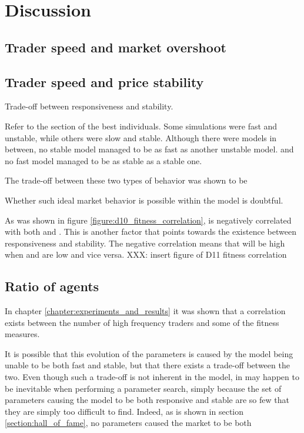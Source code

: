 \chapter{Discussion}\label{chapter:discussion}

\section{Trader speed and market overshoot}

\section{Trader speed and price stability}
Trade-off between responsiveness and stability.

Refer to the section of the best individuals. 
Some simulations were fast and unstable, while others were slow and stable. Although there were models in between, no stable model managed to be as fast as another unstable model. and no fast model managed to be as stable as a stable one. 

The trade-off between these two types of behavior was shown to be 

Whether such ideal market behavior is possible within the model is doubtful. 



As was shown in figure \ref{figure:d10_fitness_correlation}, \timetoreachnewfundamental{} is negatively correlated with both \stdev{} and \overshoot{}. This is another factor that points towards the existence between responsiveness and stability. The negative correlation means that \timetoreachnewfundamental will be high when \stdev and \overshoot are low and vice versa. 
XXX: insert figure of D11 fitness correlation

\section{Ratio of agents}
In chapter \ref{chapter:experiments_and_results} it was shown that a correlation exists between the number of high frequency traders and some of the fitness measures. 

It is possible that this evolution of the parameters is caused by the model being unable to be both fast and stable, but that there exists a trade-off between the two. Even though such a trade-off is not inherent in the model, in may happen to be inevitable when performing a parameter search, simply because the set of parameters causing the model to be both responsive and stable are so few that they are simply too difficult to find. Indeed, as is shown in section \ref{section:hall_of_fame}, no parameters caused the market to be both 


